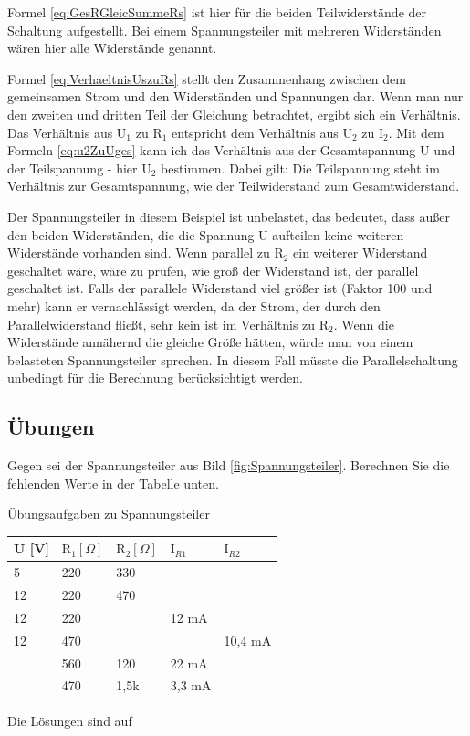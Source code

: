\documentclass[aspectratio=169, ignorenonframetext]{beamer}
\begin{document}
Formel \ref{eq:GesRGleicSummeRs} ist hier für die beiden Teilwiderstände der Schaltung aufgestellt. Bei einem Spannungsteiler mit mehreren Widerständen wären hier alle Widerstände genannt.

Formel \ref{eq:VerhaeltnisUszuRs} stellt den Zusammenhang zwischen dem gemeinsamen Strom und den Widerständen und Spannungen dar. Wenn man nur den zweiten und dritten Teil der Gleichung betrachtet, ergibt sich ein Verhältnis. Das Verhältnis aus $\text{U}_1$ zu $\text{R}_1$ entspricht dem Verhältnis aus $\text{U}_2$ zu $\text{I}_2$. Mit dem Formeln \ref{eq:u2ZuUges} kann ich das Verhältnis aus der Gesamtspannung U und der Teilspannung - hier $\text{U}_2$ bestimmen. Dabei gilt: Die Teilspannung steht im Verhältnis zur Gesamtspannung, wie der Teilwiderstand zum Gesamtwiderstand.

Der Spannungsteiler in diesem Beispiel ist unbelastet, das bedeutet, dass außer den beiden Widerständen, die die Spannung U aufteilen keine weiteren Widerstände vorhanden sind. Wenn parallel zu $\text{R}_2$ ein weiterer Widerstand geschaltet wäre, wäre zu prüfen, wie groß der Widerstand ist, der parallel geschaltet ist. Falls der parallele Widerstand viel größer ist (Faktor 100 und mehr) kann er vernachlässigt werden, da der Strom, der durch den Parallelwiderstand fließt, sehr kein ist im Verhältnis zu $\text{R}_2$. Wenn die Widerstände annähernd die gleiche Größe hätten, würde man von einem belasteten Spannungsteiler sprechen. In diesem Fall müsste die Parallelschaltung unbedingt für die Berechnung berücksichtigt werden.

\subsection{Übungen}

Gegen sei der Spannungsteiler aus Bild \ref{fig:Spannungsteiler}. Berechnen Sie die fehlenden Werte in der Tabelle unten.\\

\begin{frame}{Übungsaufgaben zu Spannungsteiler}\label{Aufg:Spannungsteiler}
  \begin{tabular}{l|ll|ll}
    U [V] & $\text{R}_1 [\Omega]$& $\text{R}_2 [\Omega]$& $\text{I}_{R1}$ & $\text{I}_{R2}$\\ \hline
    5  & 220 & 330 &       & \\
    12 & 220 & 470 &       & \\
    12 & 220 &     & 12 mA & \\
    12 & 470 &     &       & 10,4 mA  \\
    & 560 & 120 & 22 mA &   \\
    & 470 & 1,5k &  3,3 mA &   \\
  \end{tabular}
\end{frame}
Die Lösungen sind auf \pageref{Lsg:Spannungsteiler}
\end{document}

